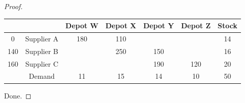 \documentclass[a4paper]{article}
\begin{document}
\begin{eg}
\begin{proof}
\begin{center}
\begin{tabular}{|c|c|c|c|c|c|c|}
				\hline
				             &            & Depot W & Depot X & Depot Y & Depot Z & Stock \\
				\hline
				0            & Supplier A & 180     & 110     &         &         & 14    \\
				\hline
				140          & Supplier B &         & 250     & 150     &         & 16    \\
				\hline
				160          & Supplier C &         &         & 190     & 120     & 20    \\
				\hline
				             & Demand     & 11      & 15      & 14      & 10      & 50    \\
				\hline
			\end{tabular}
		\end{center}
		Done.
	\end{proof}
\end{eg}
\end{document}
